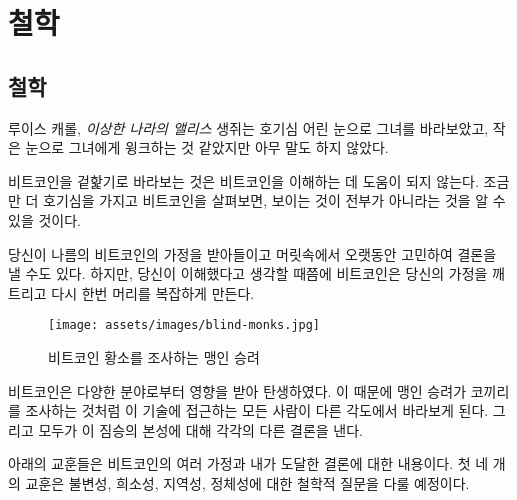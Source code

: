 \part{철학}
\label{ch:philosophy}
\chapter*{철학}

\begin{chapquote}{루이스 캐롤, \textit{이상한 나라의 앨리스}}
생쥐는 호기심 어린 눈으로 그녀를 바라보았고, 작은 눈으로 그녀에게 윙크하는 것 같았지만 아무 말도 하지 않았다.
\end{chapquote}

비트코인을 겉핥기로 바라보는 것은 비트코인을 이해하는 데 도움이 되지 않는다. 조금만 더 호기심을 가지고 비트코인을 살펴보면, 보이는 것이 
전부가 아니라는 것을 알 수 있을 것이다.

당신이 나름의 비트코인의 가정을 받아들이고 머릿속에서 오랫동안 고민하여 결론을 낼 수도 있다. 하지만,
당신이 이해했다고 생각할 때쯤에 비트코인은 당신의 가정을 깨트리고 다시 한번 머리를 복잡하게 만든다.

\begin{figure}
  \texttt{[image: assets/images/blind-monks.jpg]}
  \caption{비트코인 황소를 조사하는 맹인 승려}
  \label{fig:blind-monks}
\end{figure}

비트코인은 다양한 분야로부터 영향을 받아 탄생하였다. 
이 때문에 맹인 승려가 코끼리를 조사하는 것처럼 이 기술에 접근하는 모든 사람이 다른 각도에서 바라보게 된다. 
그리고 모두가 이 짐승의 본성에 대해 각각의 다른 결론을 낸다.

아래의 교훈들은 비트코인의 여러 가정과 내가 도달한 결론에 대한 내용이다. 첫 네 개의 교훈은
불변성, 희소성, 지역성, 정체성에 대한 철학적 질문을 다룰 예정이다.

